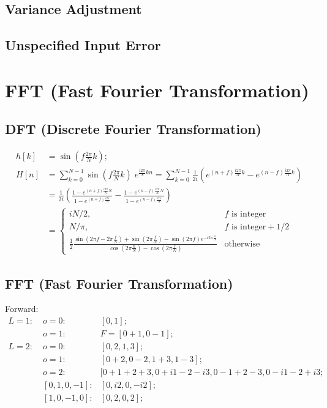 \documentclass[twoside]{article}
\numberwithin{equation}{section}
\begin{document}
\subsection{Variance Adjustment} 

\subsection{Unspecified Input Error}

\section{FFT (Fast Fourier Transformation)}

\subsection{DFT (Discrete Fourier Transformation)}

\begin{align*}
h[k] &= \sin(f \frac{2 \pi}{N} k); \\
H[n] &= \sum_{k=0}^{N-1} \sin(f \frac{2 \pi}{N} k) \; e^{\frac{i 2\pi}{N} k n}
		= \sum_{k=0}^{N-1} \frac{1}{2i}\left( e^{(n + f) \frac{i 2\pi}{N} k} - e^{(n - f) \frac{i 2\pi}{N} k} \right)   \\
	&= \frac{1}{2i} \left( \frac{1 - e^{(n + f) \frac{i 2\pi}{N} N}}{1 - e^{(n + f) \frac{i 2\pi}{N}}}
		- \frac{1 - e^{(n - f) \frac{i 2\pi}{N} N}}{1 - e^{(n - f) \frac{i 2\pi}{N}}} \right) \\
&= \begin{cases}
  i N/2, & f \text{ is integer} \\
  N/\pi, & f \text{ is integer} + 1/2 \\
  \frac{1}{2} \frac{\sin(2\pi f - 2\pi \frac{f}{N}) + \sin(2\pi \frac{f}{N})-\sin(2\pi f) e^{-i 2\pi \frac{n}{N}}}{\cos(2\pi \frac{n}{N})-\cos(2\pi \frac{f}{N})} & \text{otherwise}
\end{cases}
\end{align*}


\subsection{FFT (Fast Fourier Transformation)}

Forward:
\begin{align*}
L = 1:\;& o=0: & [0, 1]; \\
 & o = 1: & F = [0 + 1, 0 - 1]; \\
L = 2:\;& o=0: & [0, 2, 1, 3]; \\
 & o = 1: & [0 + 2, 0 - 2, 1 + 3, 1 - 3]; \\
 & o = 2: & [0 + 1 + 2 + 3, 0 + i 1 - 2 - i 3 , 0 - 1 + 2 - 3, 0 - i 1 - 2 + i 3; \\
 & [0, 1, 0, -1]:& [0, i 2, 0, - i 2]; \\
 & [1, 0, -1, 0]:& [0, 2, 0, 2];
\end{align*}
\end{document}
